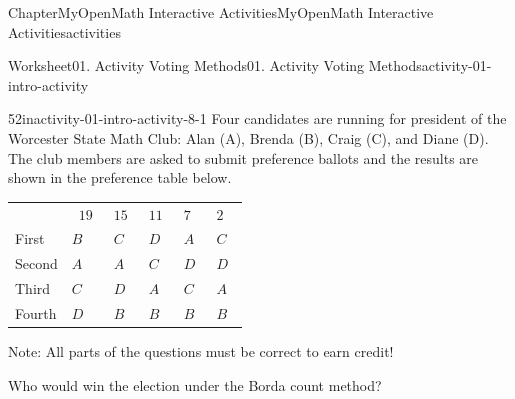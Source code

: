 \documentclass[oneside,10pt,]{book}
\newcommand{\blocktitlefont}{\relax}
\newcommand{\tabularfont}{\relax}
\newcommand{\ptxlistdisc}{\raisebox{0.3ex}{\textbullet}}
\newlength{\fillinmaxwidth}
\newlength{\fillincontract}
\newlength{\charmaxwidth}\setlength{\charmaxwidth}{0.5em}
\newlength{\charminwidth}\setlength{\charminwidth}{0.1em}
\newlength{\fillinheight}
\newcommand{\fillintext}[1]{%
\setlength{\fillinmaxwidth}{#1\charmaxwidth}%
\setlength{\fillincontract}{#1\charminwidth}%
\setlength{\fillinheight}{\baselineskip}\addtolength{\fillinheight}{1.2pt}%
\strut\nobreak\leaders\vbox{\hrule width 0.3pt height 0.3pt \vskip -1.2pt}\hskip 1\fillinmaxwidth minus \fillincontract\nobreak\strut%
}
\begin{document}
\begin{chapterptx}{Chapter}{MyOpenMath Interactive Activities}{}{MyOpenMath Interactive Activities}{}{}{activities}
\begin{worksheet-section}{Worksheet}{01. Activity Voting Methods}{}{01. Activity Voting Methods}{}{}{activity-01-intro-activity}
%
\clearpage
\begin{divisionexercise}{5}{}{2in}{activity-01-intro-activity-8-1}%
Four candidates are running for president of the Worcester State Math Club: Alan (A), Brenda (B), Craig (C), and Diane (D). The club members are asked to submit preference ballots and the results are shown in the preference table below.%
\begin{center}%
{\tabularfont%
\begin{tabular}{llllll}
 & \(\displaystyle{19}\) &\(\displaystyle{15}\) &\(\displaystyle{11}\) &\(\displaystyle{7}\) &\(\displaystyle{2}\) \tabularnewline[0pt]
First&\(\displaystyle{B}\) &\(\displaystyle{C}\) &\(\displaystyle{D}\) &\(\displaystyle{A}\) &\(\displaystyle{C}\) \tabularnewline[0pt]
Second&\(\displaystyle{A}\) &\(\displaystyle{A}\) &\(\displaystyle{C}\) &\(\displaystyle{D}\) &\(\displaystyle{D}\) \tabularnewline[0pt]
Third&\(\displaystyle{C}\) &\(\displaystyle{D}\) &\(\displaystyle{A}\) &\(\displaystyle{C}\) &\(\displaystyle{A}\) \tabularnewline[0pt]
Fourth&\(\displaystyle{D}\) &\(\displaystyle{B}\) &\(\displaystyle{B}\) &\(\displaystyle{B}\) &\(\displaystyle{B}\) 
\end{tabular}
}%
\end{center}%
Note: All parts of the questions must be correct to earn credit!%
\par
Who would win the election under the Borda count method?%
\par
%
\begin{enumerate}[label={(\alph*)}]

\end{enumerate}
\end{divisionexercise}
\end{worksheet-section}
\end{chapterptx}
\end{document}
